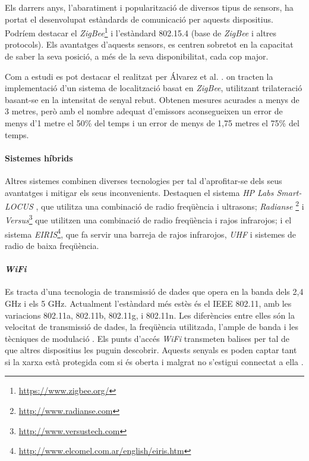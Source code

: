 Els darrers anys, l'abaratiment i popularització de diversos tipus de sensors, ha portat el desenvolupat estàndards de comunicació per aquests dispositius. Podríem destacar el \textit{ZigBee}\footnote{\url{https://www.zigbee.org/}} i l'estàndard 802.15.4 (base de \textit{ZigBee} i altres protocols). Els avantatges d'aquests sensors, es centren sobretot en la capacitat de saber la seva posició, a més de la seva disponibilitat, cada cop major.

Com a estudi es pot destacar el realitzat per Álvarez et al. \cite{alvarez}. on tracten la implementació d’un sistema de localització basat en \textit{ZigBee}, utilitzant trilateració basant-se en la intensitat de senyal rebut. Obtenen mesures acurades a menys de 3 metres, però amb el nombre adequat d'emissors aconsegueixen un error de menys d’1 metre el 50\% del temps i un error de menys de 1,75 metres el 75\% del temps.

\paragraph{Sistemes híbrids}

Altres sistemes combinen diverses tecnologies per tal d'aprofitar-se dels seus avantatges i mitigar els seus inconvenients. Destaquen el sistema \textit{HP Labs Smart-LOCUS} \cite{oconnor}, que utilitza una combinació de radio freqüència i ultrasons; \textit{Radianse} \footnote{\url{http://www.radianse.com}} i \textit{Versus}\footnote{\url{http://www.versustech.com}} que utilitzen una combinació de radio freqüència i rajos infrarojos; i el sistema \textit{EIRIS}\footnote{\url{http://www.elcomel.com.ar/english/eiris.htm}}, que fa servir una barreja de rajos infrarojos, \textit{UHF} i sistemes de radio de baixa freqüència.

\paragraph{\textit{WiFi}}

Es tracta d'una tecnologia de transmissió de dades que opera en la banda dels 2,4 GHz i els 5 GHz. Actualment l'estàndard més estès és el IEEE 802.11, amb les variacions 802.11a, 802.11b, 802.11g, i 802.11n. Les diferències entre elles són la velocitat de transmissió de dades, la freqüència utilitzada, l’ample de banda i les tècniques de modulació \cite{chan}. Els punts d’accés \textit{WiFi} transmeten balises per tal de que altres dispositius les puguin descobrir. Aquests senyals es poden captar tant si la xarxa està protegida com si és oberta i malgrat no s’estigui connectat a ella \cite{vilaseca}.

